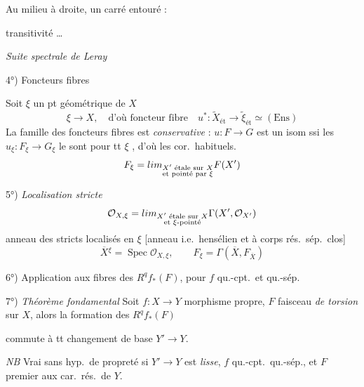 \documentclass[11pt,a4paper]{article}
\begin{document}
Au milieu à droite, un carré entouré :



transitivité …

\emph{Suite spectrale de Leray} 

4°) Foncteurs fibres

Soit $\xi$ un pt géométrique de $X$
\[
  \xi \to X, \quad \text{d'où foncteur fibre} \quad
  u^{*} : \widetilde{X}_{\mathrm{ét}} \to \widetilde{\xi}_{\mathrm{ét}} \simeq (\mathrm{Ens})
\]
La famille des foncteurs fibres est \emph{conservative} : $u : F \to G$ est un
isom ssi les $u_\xi : F_\xi \to G_\xi$ le sont pour tt $\xi$
, d'où les cor.\ habituels.
\[
  F_\xi = \varinjlim_{\substack{X' \text{ étale sur } X\\ \text{et pointé par } \xi}} F(X')
\]

5°) \emph{Localisation stricte}
\[
  \mathcal{O}_{X,\xi} = \varinjlim_{\substack{X' \text{ étale sur } X\\ \text{et } \xi\text{-pointé}}} \Gamma(X', \mathcal{O}_{X'})
\]
anneau des stricts localisés en $\xi$ [anneau \struck{\ill{}}
 i.e.\ hensélien et à corps rés.\ sép.\ clos]
\[
  \overline{X}{}^{\xi} = \operatorname{Spec} \mathcal{O}_{X,\xi}, \qquad
  F_\xi = \Gamma(\overline{X}, F_{\overline{X}})
\]

6°) Application aux fibres des $R^q f_{*}(F)$, pour $f$ qu.-cpt.\ et qu.-sép.

7°) \emph{Théorème fondamental} Soit $f : X \to Y$ morphisme propre, $F$
faisceau \emph{de torsion} sur $X$, alors la formation des $R^q f_{*}(F)$

commute à tt changement de base $Y' \to Y$.

\emph{NB} Vrai sans hyp.\ de propreté si $Y' \to Y$ est \emph{lisse}, $f$
qu.-cpt.\ qu.-sép., et $F$ premier aux car.\ rés.\ de $Y$.

\end{document}
